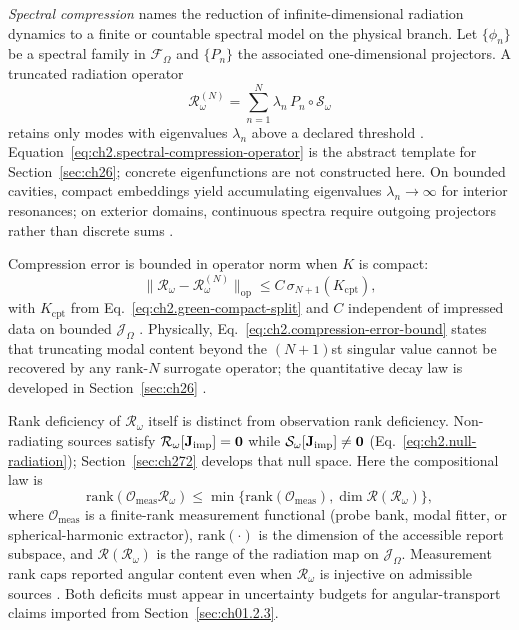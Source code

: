 \emph{Spectral compression} names the reduction of infinite-dimensional radiation dynamics to a finite or countable spectral model on the physical branch. Let \(\{\phi_n\}\) be a spectral family in \(\mathcal{F}_\Omega\) and \(\{P_n\}\) the associated one-dimensional projectors. A truncated radiation operator
\begin{equation}
\label{eq:ch2.spectral-compression-operator}
\mathcal{R}_\omega^{(N)}
=
\sum_{n=1}^{N}\lambda_n\,P_n\circ\mathcal{S}_\omega
\end{equation}
retains only modes with eigenvalues \(\lambda_n\) above a declared threshold \cite{stratton1941}. Equation~\eqref{eq:ch2.spectral-compression-operator} is the abstract template for Section~\ref{sec:ch26}; concrete eigenfunctions are not constructed here. On bounded cavities, compact embeddings yield accumulating eigenvalues \(\lambda_n\to\infty\) for interior resonances; on exterior domains, continuous spectra require outgoing projectors rather than discrete sums \cite{stratton1941}.

Compression error is bounded in operator norm when \(K\) is compact:
\begin{equation}
\label{eq:ch2.compression-error-bound}
\|\mathcal{R}_\omega-\mathcal{R}_\omega^{(N)}\|_{\mathrm{op}}
\le
C\,\sigma_{N+1}(K_{\mathrm{cpt}}),
\end{equation}
with \(K_{\mathrm{cpt}}\) from Eq.~\eqref{eq:ch2.green-compact-split} and \(C\) independent of impressed data on bounded \(\mathcal{J}_\Omega\) \cite{harrington2001}. Physically, Eq.~\eqref{eq:ch2.compression-error-bound} states that truncating modal content beyond the \((N+1)\)st singular value cannot be recovered by any rank-\(N\) surrogate operator; the quantitative decay law is developed in Section~\ref{sec:ch26} \cite{stratton1941}.

Rank deficiency of \(\mathcal{R}_\omega\) itself is distinct from observation rank deficiency. Non-radiating sources satisfy \(\mathcal{R}_\omega[\mathbf{J}_{\mathrm{imp}}]=\mathbf{0}\) while \(\mathcal{S}_\omega[\mathbf{J}_{\mathrm{imp}}]\neq\mathbf{0}\) (Eq.~\eqref{eq:ch2.null-radiation}); Section~\ref{sec:ch272} develops that null space. Here the compositional law is
\begin{equation}
\label{eq:ch2.rank-composition-law}
\mathrm{rank}(\mathcal{O}_{\mathrm{meas}}\mathcal{R}_\omega)
\le
\min\big\{\mathrm{rank}(\mathcal{O}_{\mathrm{meas}}),
\dim\mathcal{R}(\mathcal{R}_\omega)\big\},
\end{equation}
where \(\mathcal{O}_{\mathrm{meas}}\) is a finite-rank measurement functional (probe bank, modal fitter, or spherical-harmonic extractor), \(\mathrm{rank}(\cdot)\) is the dimension of the accessible report subspace, and \(\mathcal{R}(\mathcal{R}_\omega)\) is the range of the radiation map on \(\mathcal{J}_\Omega\). Measurement rank caps reported angular content even when \(\mathcal{R}_\omega\) is injective on admissible sources \cite{stratton1941}. Both deficits must appear in uncertainty budgets for angular-transport claims imported from Section~\ref{sec:ch01.2.3}.

